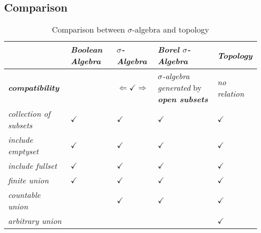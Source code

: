 \documentclass[11pt]{article}
\begin{document}
\subsection{Comparison}
\begin{table}[h!]
\setlength{\abovedisplayskip}{0pt}
\setlength{\belowdisplayskip}{-10pt}
\setlength{\abovedisplayshortskip}{0pt}
\setlength{\belowdisplayshortskip}{0pt}
\footnotesize
\centering
\caption{Comparison between $\sigma$-algebra and topology}
\label{tab: measure}
\renewcommand\tabularxcolumn[1]{m{#1}}
\small
\begin{tabularx}{1\textwidth} { 
  | >{\raggedright\arraybackslash} m{3cm}
  | >{\centering\arraybackslash}X
  | >{\centering\arraybackslash}X
  | >{\centering\arraybackslash}X
  | >{\centering\arraybackslash}X  | }
 \hline
  &  \emph{\textbf{Boolean Algebra}} & \emph{\textbf{$\sigma$-Algebra}}   &  \emph{\textbf{Borel $\sigma$-Algebra}}   & \emph{\textbf{Topology}} \\
  \hline 
\textbf{\emph{compatibility}}    & & $\Leftarrow \checkmark \Rightarrow$  & \emph{$\sigma$-algebra generated} by \emph{\textbf{open subsets}} & \emph{no relation} \\
 \hline \vspace{5pt}
\emph{collection of subsets}  \vspace{2pt} &  $\checkmark$  & $\checkmark$  & $\checkmark$  & $\checkmark$  \\
 \hline \vspace{5pt}
\emph{include emptyset} \vspace{2pt}  &  $\checkmark$  & $\checkmark$  & $\checkmark$  & $\checkmark$  \\
\hline \vspace{5pt}
\emph{include fullset}  \vspace{2pt}  &  $\checkmark$  & $\checkmark$  & $\checkmark$  & $\checkmark$  \\
\hline \vspace{5pt}
\emph{finite union} \vspace{2pt}   & $\checkmark$  & $\checkmark$  & $\checkmark$  & $\checkmark$  \\
\hline \vspace{5pt}
\emph{countable union} \vspace{2pt}   &   & $\checkmark$  & $\checkmark$  & $\checkmark$  \\
\hline \vspace{5pt}
\emph{arbitrary union} \vspace{2pt}   &   &  &  & $\checkmark$  \\

\end{tabularx}
\end{table}
\end{document}
